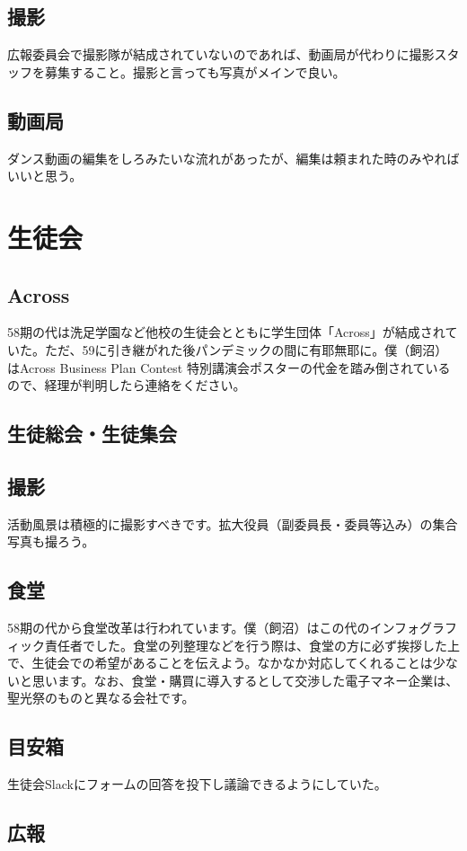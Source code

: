 \documentclass[dvipdfmx,jb5]{jarticle}
\begin{document}
\subsection{撮影}
広報委員会で撮影隊が結成されていないのであれば、動画局が代わりに撮影スタッフを募集すること。撮影と言っても写真がメインで良い。
\subsection{動画局}
ダンス動画の編集をしろみたいな流れがあったが、編集は頼まれた時のみやればいいと思う。
\section{生徒会}
\subsection{Across}
58期の代は洗足学園など他校の生徒会とともに学生団体「Across」が結成されていた。ただ、59に引き継がれた後パンデミックの間に有耶無耶に。僕（飼沼）はAcross Business Plan Contest 特別講演会ポスターの代金を踏み倒されているので、経理が判明したら連絡をください。

\subsection{生徒総会・生徒集会}
\subsection{撮影}
活動風景は積極的に撮影すべきです。拡大役員（副委員長・委員等込み）の集合写真も撮ろう。

\subsection{食堂}
58期の代から食堂改革は行われています。僕（飼沼）はこの代のインフォグラフィック責任者でした。食堂の列整理などを行う際は、食堂の方に必ず挨拶した上で、生徒会での希望があることを伝えよう。なかなか対応してくれることは少ないと思います。なお、食堂・購買に導入するとして交渉した電子マネー企業は、聖光祭のものと異なる会社です。

\subsection{目安箱}
生徒会Slackにフォームの回答を投下し議論できるようにしていた。
\subsection{広報}
\end{document}
